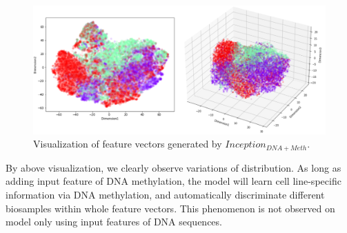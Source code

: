 \begin{figure}[H]
    \centering
    \includegraphics[width=1\columnwidth]{body/figure/figure19.png}
    \captionsetup{labelfont=bf}
    \renewcommand{\baselinestretch}{1.0}
    \caption[Visualization of feature vectors generated by $Inception_{DNA+Meth}$]{Visualization of feature vectors generated by $Inception_{DNA+Meth}$.}
    \label{f19}
\end{figure}

By above visualization, we clearly observe variations of distribution. As long as adding input feature of DNA methylation, the model will learn cell line-specific information via DNA methylation, and automatically discriminate different biosamples within whole feature vectors. This phenomenon is not observed on model only using input features of DNA sequences.
